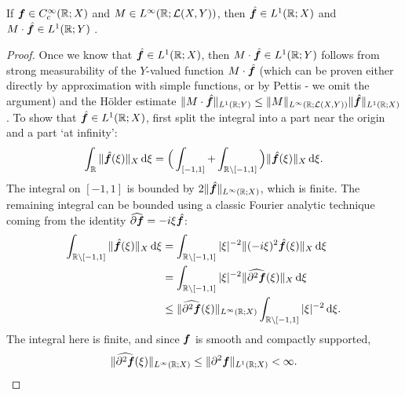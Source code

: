 \begin{prop}
  If $\bm{f} \in C_{c}^\infty(\mathbb{R};X)$ and $M \in L^\infty(\mathbb{R};\mathcal{L}(X,Y))$, then $\hat{\bm{f}} \in L^1(\mathbb{R};X)$ and $M \cdot \hat{\bm{f}} \in L^1(\mathbb{R};Y)$ .
\end{prop}

\begin{proof}
  Once we know that $\hat{\bm{f}} \in L^1(\mathbb{R};X)$, then $M \cdot \hat{\bm{f}} \in L^1(\mathbb{R};Y)$ follows from strong measurability of the $Y$-valued function $M \cdot \hat{\bm{f}}$ (which can be proven either directly by approximation with simple functions, or by Pettis - we omit the argument) and the H\"older estimate $\|M \cdot \hat{\bm{f}}\|_{L^1(\mathbb{R};Y)} \leq \|M\|_{L^\infty(\mathbb{R};\mathcal{L}(X,Y))} \|\hat{\bm{f}}\|_{L^1(\mathbb{R};X)}$.
  To show that $\hat{\bm{f}} \in L^1(\mathbb{R};X)$, first split the integral into a part near the origin and a part `at infinity':
  \begin{equation*}
    \int_{\mathbb{R}} \|\hat{\bm{f}}(\xi)\|_{X} \, \mathrm{d}\xi = \Big( \int_{[-1,1]} + \int_{\mathbb{R} \setminus [-1,1]} \Big) \|\hat{\bm{f}}(\xi)\|_{X} \, \mathrm{d}\xi.
  \end{equation*}
  The integral on $[-1,1]$ is bounded by $2\|\hat{\bm{f}}\|_{L^\infty(\mathbb{R};X)}$, which is finite.
  The remaining integral can be bounded using a classic Fourier analytic technique coming from the identity $\widehat{\partial \bm{f}} = -i\xi \hat{\bm{f}}$:
  \begin{equation*}
    \begin{aligned}
    \int_{\mathbb{R} \setminus [-1,1]} \|\hat{\bm{f}}(\xi)\|_{X} \, \mathrm{d}\xi
    &= \int_{\mathbb{R} \setminus [-1,1]} |\xi|^{-2} \|(-i\xi)^{2}\hat{\bm{f}}(\xi)\|_{X} \, \mathrm{d}\xi \\
    &= \int_{\mathbb{R} \setminus [-1,1]} |\xi|^{-2} \|\widehat{\partial^{2} \bm{f}}(\xi)\|_{X} \, \mathrm{d}\xi \\
    &\leq \|\widehat{\partial^{2} \bm{f}}(\xi)\|_{L^\infty(\mathbb{R};X)} \int_{\mathbb{R} \setminus [-1,1]} |\xi|^{-2} \, \mathrm{d}\xi .
  \end{aligned}
\end{equation*}
The integral here is finite, and since $\bm{f}$ is smooth and compactly supported, 
\begin{equation*}
   \|\widehat{\partial^{2} \bm{f}}(\xi)\|_{L^\infty(\mathbb{R};X)} \leq \|\partial^{2} \bm{f}\|_{L^1(\mathbb{R};X)} < \infty.
\end{equation*}
\end{proof}

